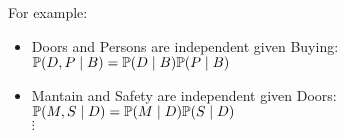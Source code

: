 	\begin{frame}[fragile]
		For example:
		\begin{figure}
			\centering
			
		\end{figure}
		\begin{block}{}
			\begin{itemize}
				\item \alert{Doors} and \alert{Persons} are independent given \alert{Buying}: $\P( D , P \mid B ) = \P( D \mid B ) \P( P \mid B )$
				\item \alert{Mantain} and \alert{Safety} are independent given \alert{Doors}: $\P( M , S \mid D ) = \P( M \mid D ) \P( S \mid D )$
				\\$\vdots$
			\end{itemize}
		\end{block}
	\end{frame}